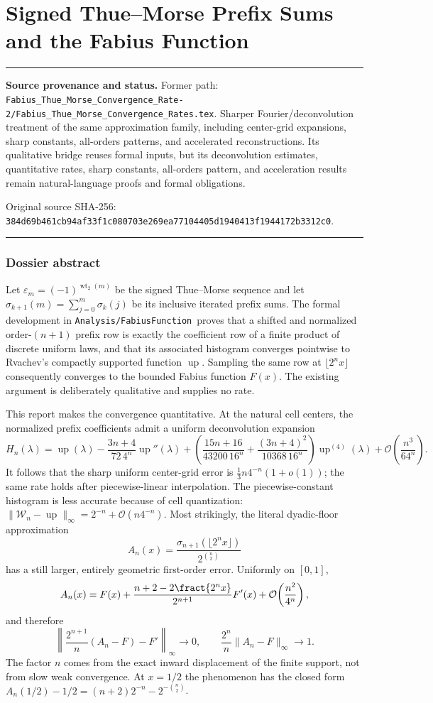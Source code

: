 \documentclass[11pt,oneside]{article}
\theoremstyle{definition}
\theoremstyle{remark}
\newcommand{\Up}{\operatorname{up}}
\newcommand{\wt}{\operatorname{wt}_2}
\newcommand{\bigO}{\mathcal O}
\newcommand{\repo}{\nolinkurl{Analysis/FabiusFunction}}
\newenvironment{boxedremark}{%
  \par\smallskip\noindent\begin{center}\begin{minipage}{0.94\textwidth}%
  \color{black}\hrule\vspace{0.6em}\small
}{%
  \vspace{0.6em}\hrule\end{minipage}\end{center}\smallskip
}
\begin{document}
\part{Signed Thue--Morse Prefix Sums and the Fabius Function}
\label{part:tmrates}
\begin{boxedremark}
\textbf{Source provenance and status.} Former path: \nolinkurl{Fabius_Thue_Morse_Convergence_Rate-2/Fabius_Thue_Morse_Convergence_Rates.tex}.  Sharper Fourier/deconvolution treatment of the same approximation family, including center-grid expansions, sharp constants, all-orders patterns, and accelerated reconstructions.  Its qualitative bridge reuses formal inputs, but its deconvolution estimates, quantitative rates, sharp constants, all-orders pattern, and acceleration results remain natural-language proofs and formal obligations.\par\smallskip Original source SHA-256: \nolinkurl{384d69b461cb94af33f1c080703e269ea77104405d1940413f1944172b3312c0}.
\end{boxedremark}
\section*{Dossier abstract}
Let $\varepsilon_m=(-1)^{\wt(m)}$ be the signed Thue--Morse sequence and let
$\sigma_{k+1}(m)=\sum_{j=0}^{m}\sigma_k(j)$ be its inclusive iterated prefix sums.  The
formal development in \repo\ proves that a shifted and normalized order-$(n+1)$ prefix row
is exactly the coefficient row of a finite product of discrete uniform laws, and that its
associated histogram converges pointwise to Rvachev's compactly supported function $\Up$.
Sampling the same row at $\lfloor 2^n x\rfloor$ consequently converges to the bounded Fabius
function $F(x)$.  The existing argument is deliberately qualitative and supplies no rate.

This report makes the convergence quantitative.  At the natural cell centers, the normalized
prefix coefficients admit a uniform deconvolution expansion
\[
 H_n(\lambda)=\Up(\lambda)
 -\frac{3n+4}{72\,4^n}\Up''(\lambda)
 +\left(\frac{15n+16}{43200\,16^n}
       +\frac{(3n+4)^2}{10368\,16^n}\right)\Up^{(4)}(\lambda)
 +\bigO\!\left(\frac{n^3}{64^n}\right).
\]
It follows that the sharp uniform center-grid error is
$\frac13 n4^{-n}(1+o(1))$; the same rate holds after piecewise-linear interpolation.
The piecewise-constant histogram is less accurate because of cell quantization:
$\|\mathcal W_n-\Up\|_\infty=2^{-n}+\bigO(n4^{-n})$.
Most strikingly, the literal dyadic-floor approximation
\[
 A_n(x)=\frac{\sigma_{n+1}(\lfloor2^n x\rfloor)}{2^{\binom n2}}
\]
has a still larger, entirely geometric first-order error.  Uniformly on $[0,1]$,
\[
 A_n(x)=F(x)+\frac{n+2-2\fract{2^nx}}{2^{n+1}}F'(x)
          +\bigO\!\left(\frac{n^2}{4^n}\right),
\]
and therefore
\[
 \left\|\frac{2^{n+1}}n(A_n-F)-F'\right\|_\infty\longrightarrow0,
 \qquad
 \frac{2^n}{n}\|A_n-F\|_\infty\longrightarrow1.
\]
The factor $n$ comes from the exact inward displacement of the finite support, not from slow
weak convergence.  At $x=1/2$ the phenomenon has the closed form
$A_n(1/2)-1/2=(n+2)2^{-n}-2^{-\binom n2}$.
\end{document}
